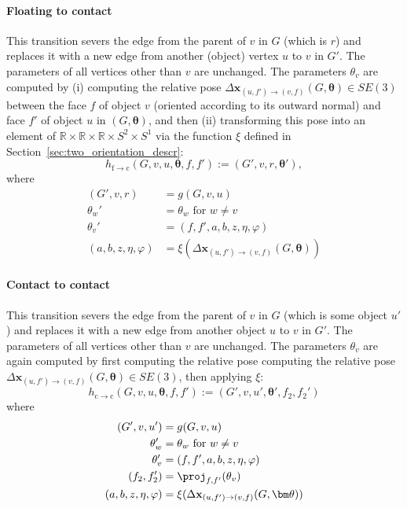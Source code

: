 \paragraph{Floating to contact}
This transition severs the edge from the parent of $v$ in $G$ (which is $r$)
and replaces it with a new edge from another (object) vertex $u$ to $v$ in $G'$.
The parameters of all vertices other than $v$ are unchanged.
The parameters $\theta_v$ are computed by (i) computing the relative pose $\Delta \mathbf{x}_{(u,f') \to (v, f)}(G, \bm\theta) \in SE(3)$ between the face $f$ of object $v$ (oriented according to its outward normal) and face $f'$ of object $u$ in $(G, \bm\theta)$, and then (ii) transforming this pose into
an element of $\mathbb{R} \times \mathbb{R} \times \mathbb{R} \times S^2 \times S^1$ via the function $\xi$ defined in Section~\ref{sec:two_orientation_descr}:
\[ h_{\mathrm{f} \to \mathrm{c}}(G, v, u, \bm\theta, f, f') := (G', v, r, \bm\theta'), \]
where
\begin{align*}
(G', v, r) &= g(G, v, u) \\
\theta_w' &= \theta_w \mbox{ for } w \ne v \\
\theta_v' &= (f, f', a, b, z, \eta, \varphi) \\
(a, b, z, \eta, \varphi) &= \xi(\Delta \mathbf{x}_{(u, f') \to (v, f)}(G, \bm\theta))
\end{align*}

\paragraph{Contact to contact}
This transition severs the edge from the parent of $v$ in $G$ (which is some object $u'$)
and replaces it with a new edge from another object $u$ to $v$ in $G'$.
The parameters of all vertices other than $v$ are unchanged.
The parameters $\theta_v$ are again computed by first computing the relative pose
computing the relative pose $\Delta \mathbf{x}_{(u,f') \to (v, f)}(G, \bm\theta) \in SE(3)$,
then applying $\xi$:
\[ h_{\mathrm{c} \to \mathrm{c}}(G, v, u, \bm\theta, f, f') := (G', v, u', \bm\theta', f_2, f_2') \]
where
\begin{align*}
(G', v, u') &= g(G, v, u) \\
\theta_w' &= \theta_w \mbox{ for } w \ne v \\
\theta_v' &= (f, f', a, b, z, \eta, \varphi) \\
(f_2, f_2') &= \proj_{f,f'}(\theta_v) \\
(a, b, z, \eta, \varphi) &= \xi(\Delta \mathbf{x}_{(u, f') \to (v, f)}(G, \bm\theta))
\end{align*}

